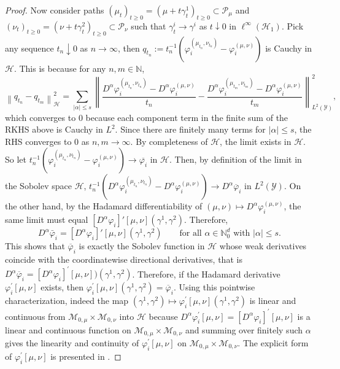 \documentclass{article}
\theoremstyle{plain}
\theoremstyle{definition}
\theoremstyle{remark}
\newcommand{\N}{\mathbb{N}}
\newcommand{\of}[1]{\left(#1\right)}
\newcommand{\abs}[1]{\left|#1\right|}
\newcommand{\cH}{\mathcal{H}}
\newcommand{\cP}{\mathcal{P}}
\newcommand{\cM}{\mathcal{M}}
\newcommand{\cY}{\mathcal{Y}}
\newcommand{\1}{\mathbbm{1}}
\newcommand{\norm}[1]{\left \| #1 \right \|}
\theoremstyle{plain}
\theoremstyle{definition}
\begin{document}
\begin{proof}
    Now consider paths $(\mu_t)_{t \geq 0} = (\mu + t \gamma_t^1)_{t \geq 0} \subset \cP_\mu$ and $(\nu_t)_{t \geq 0} = (\nu + t \gamma_t^2)_{t \geq 0} \subset \cP_\nu$ such that $\gamma_t^i \to \gamma^i$ as $t \downarrow 0$ in $\ell^\infty(\cH_1)$. Pick any sequence $t_n \downarrow 0$ as $n \to \infty$, then $q_{t_n} := t_n^{-1}\of{\varphi_i^{(\mu_{t_n}, \nu_{t_n})} - \varphi_i^{(\mu, \nu)}}$ is Cauchy in $\cH$. This is because for any $n, m \in \N$,
    \[
    \norm{q_{t_n} - q_{t_m}}_\cH^2  = \sum_{\abs{\alpha} \leq s} \norm{\frac{D^\alpha\varphi_i^{(\mu_{t_n}, \nu_{t_n})} - D^\alpha\varphi_i^{(\mu, \nu)}}{t_n} - \frac{D^\alpha\varphi_i^{(\mu_{t_m}, \nu_{t_m})} - D^\alpha\varphi_i^{(\mu, \nu)}}{t_m}}_{L^2(\cY)}^2,
    \]
    which converges to $0$ because each component term in the finite sum of the RKHS above is Cauchy in $L^2$. Since there are finitely many terms for $\abs{\alpha} \leq s$, the RHS converges to 0 as $n, m \to \infty$. By completeness of $\cH$, the limit exists in $\cH$. So let $t_n^{-1}\of{\varphi_i^{(\mu_{t_n}, \nu_{t_n})} - \varphi_i^{(\mu, \nu)}} \to \overline{\varphi_i}$ in $\cH$. Then, by definition of the limit in the Sobolev space $\mathcal{H}$, $t_n^{-1}\of{D^\alpha \varphi_i^{(\mu_{t_n}, \nu_{t_n})} - D^\alpha \varphi_i^{(\mu, \nu)}} \to D^\alpha \overline{\varphi}_i$ in $L^2(\cY)$. On the other hand, by the Hadamard differentiability of $(\mu,\nu)\mapsto D^\alpha \varphi_i^{(\mu,\nu)}$, the same limit must equal $[D^\alpha \varphi_i]'[\mu,\nu](\gamma^1,\gamma^2)$.
    Therefore,
    \[
    D^\alpha \bar\varphi_i
    =
    [D^\alpha \varphi_i]'[\mu,\nu](\gamma^1,\gamma^2)
    \qquad
    \text{for all } \alpha\in\mathbb N_0^d \text{ with } |\alpha|\le s.
    \]
    This shows that $\overline{\varphi}_i$ is exactly the Sobolev function in $\cH$ whose weak derivatives coincide with the coordinatewise directional derivatives, that is $D^\alpha \overline{\varphi}_i = [D^\alpha \varphi_i]^\prime[\mu, \nu])(\gamma^1, \gamma^2)$. Therefore, if the Hadamard derivative $\varphi_i^\prime[\mu, \nu]$ exists, then $\varphi_i^\prime[\mu, \nu](\gamma^1, \gamma^2) = \overline{\varphi}_i$. Using this pointwise characterization, indeed the map $(\gamma^1, \gamma^2) \mapsto \varphi_i^\prime[\mu,\nu](\gamma^1, \gamma^2)$ is linear and continuous from $\cM_{0, \mu} \times \cM_{0, \nu}$ into $\cH$ because $D^\alpha \varphi_i^\prime[\mu, \nu] = [D^\alpha \varphi_i]^\prime [\mu, \nu]$ is a linear and continuous function on $\cM_{0, \mu} \times \cM_{0, \nu}$ and summing over finitely such $\alpha$ gives the linearity and continuity of $\varphi_i^\prime[\mu, \nu]$ on $\cM_{0, \mu} \times \cM_{0, \nu}$. The explicit form of $\varphi_i^\prime[\mu, \nu]$ is presented in \citet[Cor.~43]{kokot2025coreset}.
    \end{proof}
\end{document}
